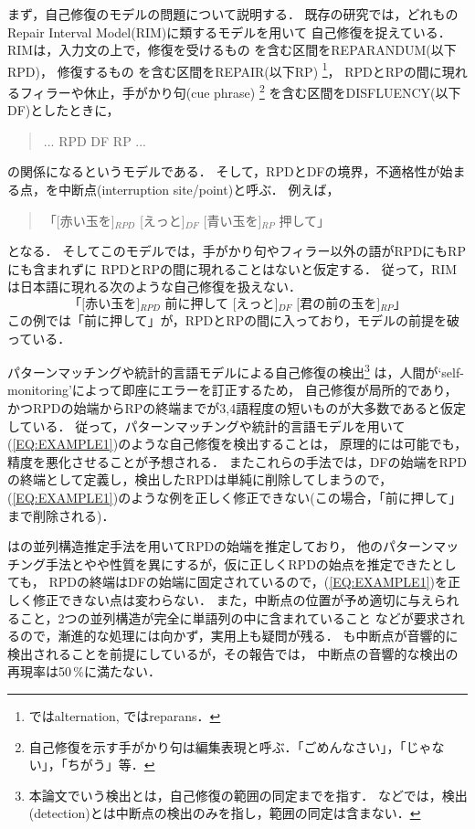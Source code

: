 まず，自己修復のモデルの問題について説明する．
既存の研究では，どれも\cite{NC1993}のRepair Interval Model(RIM)に類するモデルを用いて
自己修復を捉えている．
RIMは，入力文の上で，修復を受けるもの
を含む区間をREPARANDUM(以下RPD)，
修復するもの
を含む区間をREPAIR(以下RP)
\footnote{\cite{HP1997}ではalternation, \cite{SJ2000}ではreparans．}，
RPDとRPの間に現れるフィラーや休止，手がかり句(cue phrase)
\footnote{自己修復を示す手がかり句は編集表現と呼ぶ．「ごめんなさい」，「じゃない」，「ちがう」等．}
を含む区間をDISFLUENCY(以下DF)としたときに，
\begin{quote}
... RPD DF RP ...
\end{quote}
の関係になるというモデルである．
そして，RPDとDFの境界，不適格性が始まる点，を中断点(interruption site/point)と呼ぶ．
例えば，
\begin{quote}
「[赤い玉を]$_{RPD}$ [えっと]$_{DF}$ [青い玉を]$_{RP}$ 押して」
\end{quote}
となる．
そしてこのモデルでは，手がかり句やフィラー以外の語がRPDにもRPにも含まれずに
RPDとRPの間に現れることはないと仮定する．
従って，RIMは日本語に現れる次のような自己修復を扱えない．
\begin{equation}
\mbox{「[赤い玉を]$_{RPD}$ 前に押して [えっと]$_{DF}$ [君の前の玉を]$_{RP}$」}\label{EQ:EXAMPLE1}
\end{equation}
この例では「前に押して」が，RPDとRPの間に入っており，モデルの前提を破っている．

パターンマッチングや統計的言語モデルによる自己修復の検出\footnote{本論文でいう検出とは，自己修復の範囲の同定までを指す．
\cite{NC1993,HP1997,SJ2000}などでは，検出(detection)とは中断点の検出のみを指し，範囲の同定は含まない．}
\cite{BJ1992,NC1993,HP1997,HP1999,SJ2000}は，人間が`self-monitoring'によって即座にエラーを訂正する\cite{LW1989}ため，
自己修復が局所的であり，かつRPDの始端からRPの終端までが3,4語程度の短いものが大多数であると仮定している．
従って，パターンマッチングや統計的言語モデルを用いて(\ref{EQ:EXAMPLE1})のような自己修復を検出することは，
原理的には可能でも，精度を悪化させることが予想される．
またこれらの手法では，DFの始端をRPDの終端として定義し，検出したRPDは単純に削除してしまうので，
(\ref{EQ:EXAMPLE1})のような例を正しく修正できない(この場合，「前に押して」まで削除される)．

\cite{KG1994}は\cite{KS1992}の並列構造推定手法を用いてRPDの始端を推定しており，
他のパターンマッチング手法とやや性質を異にするが，仮に正しくRPDの始点を推定できたとしても，
RPDの終端はDFの始端に固定されているので，(\ref{EQ:EXAMPLE1})を正しく修正できない点は変わらない．
また，中断点の位置が予め適切に与えられること，2つの並列構造が完全に単語列の中に含まれていること
などが要求されるので，漸進的な処理には向かず，実用上も疑問が残る．
\cite{SJ2000}も中断点が音響的に検出されることを前提にしているが，その報告では，
中断点の音響的な検出の再現率は50\,\%に満たない．

